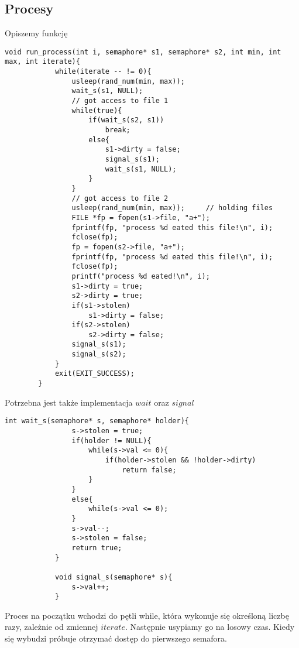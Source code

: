 \documentclass[11pt, wide]{article}
\begin{document}
    \subsection{Procesy}
    Opiszemy funkcję
    \begin{lstlisting}[style=CStyle]
        void run_process(int i, semaphore* s1, semaphore* s2, int min, int max, int iterate){
            while(iterate -- != 0){
                usleep(rand_num(min, max));
                wait_s(s1, NULL);
                // got access to file 1
                while(true){
                    if(wait_s(s2, s1))
                        break;
                    else{
                        s1->dirty = false;
                        signal_s(s1);
                        wait_s(s1, NULL);
                    }
                }
                // got access to file 2
                usleep(rand_num(min, max));     // holding files        
                FILE *fp = fopen(s1->file, "a+");
                fprintf(fp, "process %d eated this file!\n", i);
                fclose(fp);
                fp = fopen(s2->file, "a+");
                fprintf(fp, "process %d eated this file!\n", i);
                fclose(fp);
                printf("process %d eated!\n", i);
                s1->dirty = true;
                s2->dirty = true;
                if(s1->stolen)
                    s1->dirty = false;
                if(s2->stolen)
                    s2->dirty = false;
                signal_s(s1);
                signal_s(s2);   
            }
            exit(EXIT_SUCCESS);
        }\end{lstlisting}
        Potrzebna jest także implementacja $wait$ oraz $signal$
        \begin{lstlisting}[style=CStyle]
            int wait_s(semaphore* s, semaphore* holder){
                s->stolen = true;
                if(holder != NULL){
                    while(s->val <= 0){
                        if(holder->stolen && !holder->dirty)
                            return false;
                    }
                }
                else{
                    while(s->val <= 0);
                }
                s->val--;
                s->stolen = false;
                return true;
            }
            
            void signal_s(semaphore* s){
                s->val++;
            }\end{lstlisting}
        Proces na początku wchodzi do pętli while, która wykonuje się określoną liczbę razy, zależnie od zmiennej $iterate$.
        Następnie usypiamy go na losowy czas. Kiedy się wybudzi próbuje otrzymać dostęp do pierwszego semafora.
\end{document}
